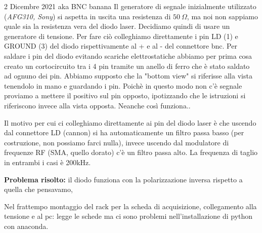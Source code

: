 \documentclass{article}
\numberwithin{equation}{section}
\begin{document}
\begin{section}{2 Dicembre 2021 aka BNC banana}
Il generatore di segnale inizialmente utilizzato (\textit{AFG310, Sony}) si aspetta in uscita una resistenza di $50~\Omega$, ma noi non sappiamo quale sia la resistenza vera del diodo laser. Decidiamo quindi di usare un generatore di tensione.
Per fare ciò colleghiamo direttamente i pin LD (1) e GROUND (3) del diodo rispettivamente al + e al - del connettore bnc. Per saldare i pin del diodo evitando scariche elettrostatiche abbiamo per prima cosa creato un cortocircuito tra i 4 pin tramite un anello di ferro che è stato saldato ad ognuno dei pin. 
Abbiamo supposto che la "bottom view" si riferisse alla vista tenendolo in mano e guardando i pin. Poichè in questo modo non c'è segnale proviamo a mettere il positivo sul pin opposto, ipotizzando che le istruzioni si riferiscono invece alla vista opposta.
Neanche così funziona..

Il motivo per cui ci colleghiamo direttamente ai pin del diodo laser è che uscendo dal connettore LD (cannon) si ha automaticamente un filtro passa basso (per costruzione, non possiamo farci nulla), invece uscendo dal modulatore di frequenze RF (SMA, quello dorato) c'è un filtro passa alto. La frequenza di taglio in entrambi i casi è 200kHz.

\textbf{Problema risolto:} il diodo funziona con la polarizzazione inversa rispetto a quella che pensavamo,

Nel frattempo montaggio del rack per la scheda di acquisizione, collegamento alla tensione e al pc: legge le schede ma ci sono problemi nell'installazione di python con anaconda.
\end{section}
\end{document}
